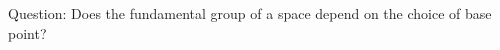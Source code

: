 \documentclass[preview]{standalone}
\begin{document}
\begin{center}
Question: Does the fundamental group of a space depend on the choice of base point?
\end{center}
\end{document}
